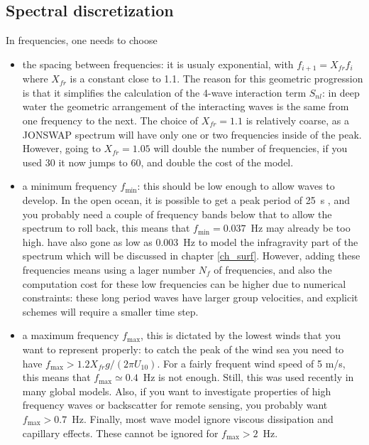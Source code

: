 \subsection{Spectral discretization}
In frequencies, one needs to choose 
\begin{itemize}
 \item the spacing between frequencies: it is usualy exponential, with $f_{i+1} = X_{fr} f_i$ where  $X_{fr}$ is a constant close to 1.1. The reason for this geometric 
 progression is that it simplifies the calculation of the 4-wave interaction term $S_{nl}$: in deep water the geometric 
 arrangement of the interacting waves is the 
 same from one frequency to the next. The choice of $X_{fr}=1.1$ is relatively coarse, as a JONSWAP spectrum will 
 have only one or two frequencies inside of the peak. However, 
 going to $X_{fr}=1.05$ will double the number of frequencies, if you used 30 it now jumps to 60, and double the 
 cost of the model.  
 \item a minimum frequency $f_{\min}$: this should be low enough to allow waves to develop. In the open ocean, 
 it is possible to get a peak period of 25~s \citep{Hanafin&al.2012},
 and you probably need a couple of frequency bands below that to allow the spectrum to roll back, this  means 
 that $f_{\min}=0.037$~Hz may already be too high.  
 \cite{Ardhuin&al.2014} have also gone as low as 0.003~Hz to model the infragravity part of the spectrum 
 which will be discussed in chapter \ref{ch_surf}. However, adding these 
 frequencies means using a lager number $N_f$ of frequencies, and also the computation cost for these low 
 frequencies can be higher due to numerical constraints: these 
 long period waves have larger group velocities, and explicit 
 schemes will require a smaller time step. 
 \item a maximum frequency $f_{\max}$, this is dictated by the lowest winds that you want to represent 
 properly: to catch the peak of the wind sea 
 you need to have  $f_{\max} > 1.2 {X}_{fr} g/(2\pi U_{10})$. For a fairly frequent wind speed of 5 m/s, 
 this means that $f_{\max} \simeq 0.4$~Hz is not enough. Still, 
 this was used  recently in many global models. Also, if you want to investigate properties of high 
 frequency waves or backscatter for remote sensing, you probably want 
  $f_{\max} > 0.7$~Hz. Finally, most wave model ignore viscous dissipation \citep{Dore1978} and capillary effects. These cannot be ignored for  $f_{\max} > 2$~Hz.
\end{itemize}

